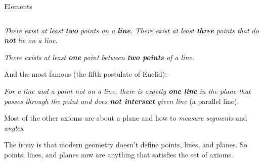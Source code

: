 \documentclass[9pt,aspectratio=169]{beamer}
\begin{document}
\begin{frame}{Elements}
\begin{columns}[T]
\begin{column}{0.5\textwidth}
\begin{definition}
        \emph{There exist at least \textbf{two} points on a \textbf{line}. There exist at least \textbf{three} points that do \textbf{not} lie on a line.}
        
        \emph{There exists at least \textbf{one} point between \textbf{two points} of a line.}

        And the most famous (the fifth postulate of Euclid):

        \emph{For a line and a point not on a line, there is exactly \textbf{one line} in the plane that passes through the point and does \textbf{not intersect} given line} (a parallel line).
      \end{definition}
      Most of the other axioms are about a plane and how to \emph{measure segments} and \emph{angles}.
      \begin{example}
        The irony is that modern geometry doesn't define points, lines, and planes. So points, lines, and planes now are anything that satisfies the set of axioms.
      \end{example}
    \end{column}
  \end{columns}
\end{frame}
\end{document}
